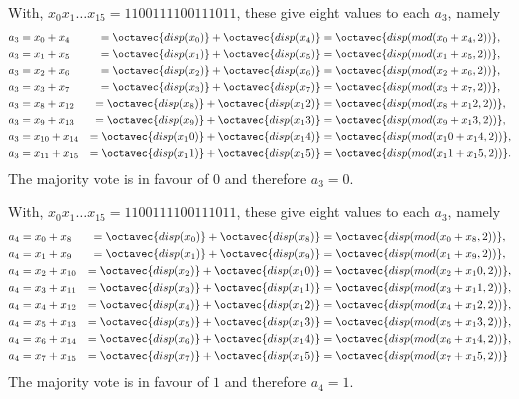 \begin{enumerate}[label=(\roman*)]
With, $x_0x_1\ldots x_{15}=1100111100111011$, these give eight values to each $a_3$, namely
\begin{alignat*}{4}
	a_3 &= x_0 + x_4
	&= \octavec{disp(x_0)}+ \octavec{disp(x_4)} &= \octavec{disp(mod(x_0+x_4,2))},\\
	a_3 &= x_1 + x_5
	&= \octavec{disp(x_1)}+ \octavec{disp(x_5)} &= \octavec{disp(mod(x_1+x_5,2))},\\
	a_3 &= x_2 + x_6
	&= \octavec{disp(x_2)}+ \octavec{disp(x_6)} &= \octavec{disp(mod(x_2+x_6,2))},\\
	a_3 &= x_3 + x_7
	&= \octavec{disp(x_3)}+ \octavec{disp(x_7)} &= \octavec{disp(mod(x_3+x_7,2))},\\
	a_3 &= x_8 + x_{12}
	&= \octavec{disp(x_8)}+ \octavec{disp(x_12)} &= \octavec{disp(mod(x_8+x_12,2))},\\
	a_3 &= x_{9} + x_{13}
	&= \octavec{disp(x_9)}+ \octavec{disp(x_13)} &= \octavec{disp(mod(x_9+x_13,2))},\\
	a_3 &= x_{10} + x_{14}
	&= \octavec{disp(x_10)}+ \octavec{disp(x_14)} &= \octavec{disp(mod(x_10+x_14,2))},\\
	a_3 &= x_{11} + x_{15}
	&= \octavec{disp(x_11)}+ \octavec{disp(x_15)} &= \octavec{disp(mod(x_11+x_15,2))}.
\end{alignat*}
The majority vote is in favour of $0$ and therefore $a_3 = 0$.

With, $x_0x_1\ldots x_{15}=1100111100111011$, these give eight values to each $a_3$, namely
\begin{alignat*}{4}
	a_4 &= x_0 + x_8
	&= \octavec{disp(x_0)}+ \octavec{disp(x_8)} &= \octavec{disp(mod(x_0+x_8,2))},\\
	a_4 &= x_1 + x_9
	&= \octavec{disp(x_1)}+ \octavec{disp(x_9)} &= \octavec{disp(mod(x_1+x_9,2))},\\
	a_4 &= x_2 + x_{10}
	&= \octavec{disp(x_2)}+ \octavec{disp(x_10)} &= \octavec{disp(mod(x_2+x_10,2))},\\
	a_4 &= x_3 + x_{11}
	&= \octavec{disp(x_3)}+ \octavec{disp(x_11)} &= \octavec{disp(mod(x_3+x_11,2))},\\
	a_4 &= x_4 + x_{12}
	&= \octavec{disp(x_4)}+ \octavec{disp(x_12)} &= \octavec{disp(mod(x_4+x_12,2))},\\
	a_4 &= x_{5} + x_{13}
	&= \octavec{disp(x_5)}+ \octavec{disp(x_13)} &= \octavec{disp(mod(x_5+x_13,2))},\\
	a_4 &= x_{6} + x_{14}
	&= \octavec{disp(x_6)}+ \octavec{disp(x_14)} &= \octavec{disp(mod(x_6+x_14,2))},\\
	a_4 &= x_{7} + x_{15}
	&= \octavec{disp(x_7)}+ \octavec{disp(x_15)} &= \octavec{disp(mod(x_7+x_15,2))}
\end{alignat*}
The majority vote is in favour of $1$ and therefore $a_4 = 1$.


\end{enumerate}
